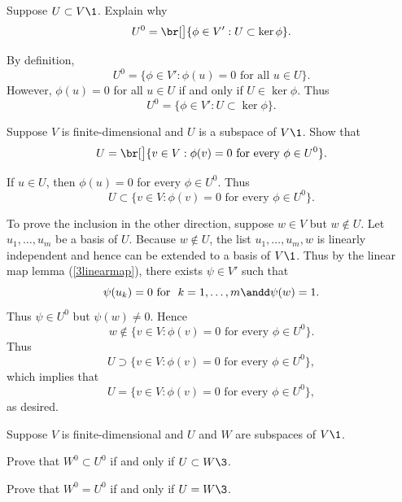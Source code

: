 \exercise
Suppose $U \subset V\1$. Explain why
\[
U^0 = \br[\big]{\phi \in V': U \subset \ker \phi}.
\]
\exercisedisplayend

\begin{Solution}
By definition,
\[
U^0 = \{\phi \in V': \phi(u) = 0 \text{\ for all\ } u \in U\}.
\]
However, $\phi(u) = 0$ for all $u \in U$ if and only if $U \in \ker \phi$. Thus
\[
U^0 = \{\phi \in V': U \subset \ker \phi\}.
\]
\end{Solution}

\exercise
Suppose $V$ is finite-dimensional and $U$ is a subspace of $V\1$. Show that\label{3Uan}
\[
U = \br[\big]{v \in V: \phi(v) = 0 \text{\ for every\ } \phi \in U^0}.
\]
\exercisedisplayend

\begin{Solution}
If $u \in U$, then $\phi(u) = 0$ for every $\phi \in U^0\!$. Thus
\[
U \subset \{v \in V: \phi(v) = 0 \text{\ for every\ } \phi \in U^0\}.
\]

To prove the inclusion in the other direction, suppose $w \in V$ but $w \notin U$. Let $u_1, \dots, u_m$ be a basis of $U$. Because $w \notin U$, the list $u_1, \dots, u_m, w$ is linearly independent and hence can be extended to a basis of $V\1$. Thus by the linear map lemma (\ref{3linearmap}), there exists $\psi \in V'$ such that
\[
\psi(u_k) = 0 \text{\ for \ } k = 1, \dots, m \andd \psi(w) = 1.
\]
Thus $\psi \in U^0$ but $\psi(w) \ne 0$. Hence
\[
w \notin \{v \in V: \phi(v) = 0 \text{\ for every\ } \phi \in U^0\}.
\]
Thus
\[
U \supset \{v \in V: \phi(v) = 0 \text{\ for every\ } \phi \in U^0\},
\]
which implies that
\[
U = \{v \in V: \phi(v) = 0 \text{\ for every\ } \phi \in U^0\},
\]
as desired.
\end{Solution}

\exercise
Suppose $V$ is finite-dimensional and $U$ and $W$ are subspaces of $V\1$.
\begin{subtheorem}
\item
Prove that $W^0 \subset U^0$ if and only if $U \subset W\3$.
\item
Prove that $W^0 = U^0$ if and only if $U = W\3$.
\end{subtheorem}
\exercisesubtheoremend

